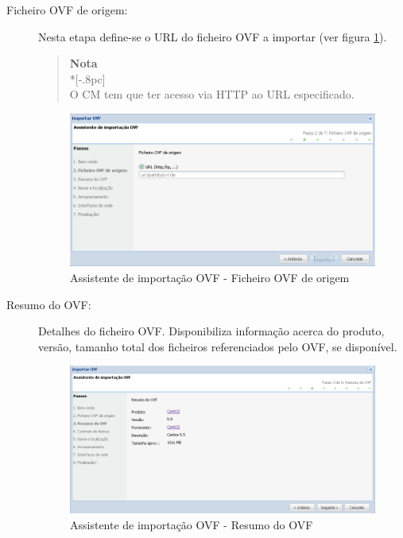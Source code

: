 \begin{description}
	\item[Ficheiro OVF de origem:] Nesta etapa define-se o URL do ficheiro OVF a importar (ver figura \ref{fig:ovf_import_file}).
		
        \begin{quote}
            {\large \bf Nota} \\*[-.8pc]
            \underline{\hspace{6in}} \\
            O CM tem que ter acesso via HTTP ao URL especificado.
        \end{quote}

        \begin{figure}[H]
            \begin{center}
            \includegraphics[scale=0.5]{screenshots/ovf_import_file.png}
            \caption{Assistente de importação OVF - Ficheiro OVF de origem}
            \label{fig:ovf_import_file}
            \end{center}
        \end{figure}

	\item[Resumo do OVF:] Detalhes do ficheiro OVF. Disponibiliza informação acerca do produto, versão, tamanho total dos ficheiros referenciados pelo OVF, se disponível.
		\begin{figure}[H]
            \begin{center}
            \includegraphics[scale=0.5]{screenshots/ovf_import_resume.png}
            \caption{Assistente de importação OVF - Resumo do OVF}
            \label{fig:ovf_import_resume}
            \end{center}
        \end{figure}


\end{description}
